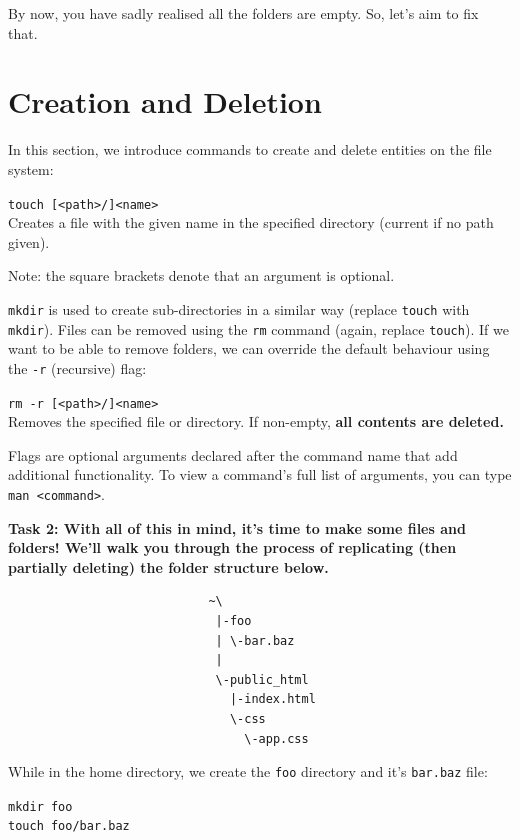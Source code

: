\documentclass[a4paper,11pt,parskip=half-]{scrartcl}
\begin{document}
\newpage

By now, you have sadly realised all the folders are empty. 
So, let's aim to fix that.

\section*{Creation and Deletion}

In this section, we introduce commands to create and delete entities on the file system:

\Large \texttt{touch [<path>/]<name>} \normalsize \\
Creates a file with the given name in the specified directory (current if no path given).

Note: the square brackets denote that an argument is optional.

\texttt{mkdir} is used to create sub-directories in a similar way (replace \texttt{touch} with \texttt{mkdir}).
Files can be removed using the \texttt{rm} command (again, replace \texttt{touch}). 
If we want to be able to remove folders, we can override the default behaviour using the \texttt{-r} (recursive) flag:

\Large \texttt{rm -r [<path>/]<name>} \normalsize \\
Removes the specified file or directory. 
If non-empty, \bfseries all contents are deleted. \normalfont 

Flags are optional arguments declared after the command name that add additional functionality. 
To view a command's full list of arguments, you can type \texttt{man <command>}.

\bfseries Task 2: \normalfont 
With all of this in mind, it’s time to make some files and folders! 
We'll walk you through the process of replicating (then partially deleting) the folder structure below.

\begin{verbatim}
                            ~\
                             |-foo  
                             | \-bar.baz  
                             |  
                             \-public_html    
                               |-index.html    
                               \-css      
                                 \-app.css
\end{verbatim}

While in the home directory, we create the \texttt{foo} directory and it's \texttt{bar.baz} file:

\qquad \texttt{mkdir foo} \\
\qquad \texttt{touch foo/bar.baz}
\end{document}
